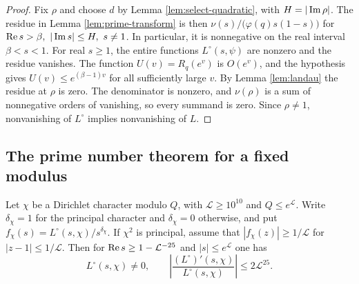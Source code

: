 \begin{proof}
Fix \(\rho\) and choose \(d\) by Lemma \ref{lem:select-quadratic}, with
\(H=|\operatorname{Im}\rho|\). The residue in Lemma \ref{lem:prime-transform} is then
\(\nu(s)/\bigl(\varphi(q)s(1-s)\bigr)\) for
\(\RePart s>\beta,\ |\ImPart s|\le H,\ s\ne1\).
In particular, it is nonnegative on the real interval \(\beta<s<1\).
For real \(s\ge1\), the entire functions \(L^\circ(s,\psi)\) are nonzero and the
residue vanishes. The function \(U(v)=R_q(e^v)\) is \(O(e^v)\), and the
hypothesis gives \(U(v)\le e^{(\beta-1)v}\) for all sufficiently large \(v\).
By Lemma \ref{lem:landau} the residue at \(\rho\) is zero.
The denominator is nonzero, and \(\nu(\rho)\) is a sum of nonnegative orders
of vanishing, so every summand is zero. Since \(\rho\ne1\), nonvanishing of
\(L^\circ\) implies nonvanishing of \(L\).
\end{proof}

\subsection{The prime number theorem for a fixed modulus}

\begin{lemma}\label{lem:uniform-log-derivative}
Let \(\chi\) be a Dirichlet character modulo \(Q\), with \(\mathcal L\ge10^{10}\)
and \(Q\le e^{\mathcal L}\). Write \(\delta_\chi=1\) for the principal character and
\(\delta_\chi=0\) otherwise, and put \(f_\chi(s)=L^\circ(s,\chi)/s^{\delta_\chi}\).
If \(\chi^2\) is principal, assume that \(|f_\chi(z)|\ge1/\mathcal L\) for
\(|z-1|\le1/\mathcal L\). Then for \(\operatorname{Re} s\ge1-\mathcal L^{-25}\) and
\(|s|\le e^{\mathcal L}\) one has
\begin{equation}\label{eq:uniform-log-derivative}
  L^\circ(s,\chi)\ne0,\qquad
  \left|\frac{(L^\circ)'(s,\chi)}{L^\circ(s,\chi)}\right|\le2\mathcal L^{25}.
\end{equation}
\end{lemma}

